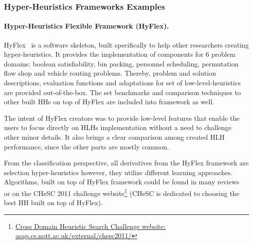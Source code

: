 \subsubsection{Hyper-Heuristics Frameworks Examples}\label{bg: hh fw examples}
\paragraph{Hyper-Heuristics Flexible Framework (HyFlex).} HyFlex~\cite{ochoa2012hyflex} is a software skeleton, built specifically to help other researchers creating hyper-heuristics. It provides the implementation of components for 6 problem domains: boolean satisfiability, bin packing, personnel scheduling, permutation flow shop and vehicle routing problems. Thereby, problem and solution descriptions, evaluation functions and adaptations for set of low-level-heuristics are provided out-of-the-box. The set benchmarks and comparison techniques to other built HHs on top of HyFlex are included into framework as well. 

The intent of HyFlex creators was to provide low-level features that enable the users to focus directly on HLHs implementation without a need to challenge other minor details. It also brings a clear comparison among created HLH performance, since the other parts are mostly common. 

From the classification perspective, all derivatives from the HyFlex framework are selection hyper-heuristics however, they utilize different learning approaches. Algorithms, built on top of HyFlex framework could be found in many reviews~\cite{misir2012intelligent,ryser2014review,drake2019recent} or on the CHeSC 2011 challenge website\footnote{\href{http://www.asap.cs.nott.ac.uk/external/chesc2011/}{Cross Domain Heuristic Search Challenge website: asap.cs.nott.ac.uk/external/chesc2011/}} (CHeSC is dedicated to choosing the best HH built on top of HyFlex).

